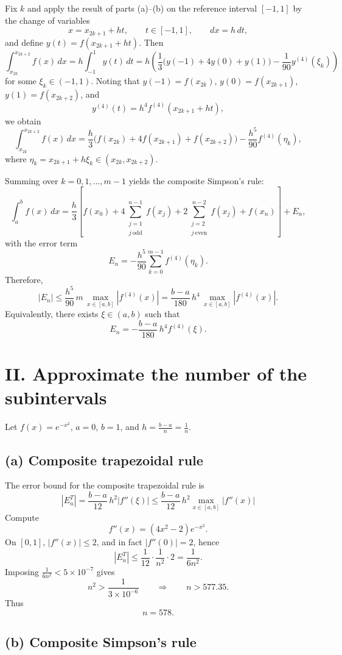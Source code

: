 \documentclass[a4paper]{article}
\begin{document}
Fix $k$ and apply the result of parts (a)--(b) on the reference interval $[-1,1]$ by the change of variables
\[
x=x_{2k+1}+ht,\qquad t\in[-1,1],\qquad dx=h\,dt,
\]
and define $y(t)=f(x_{2k+1}+ht)$. Then
\[
\int_{x_{2k}}^{x_{2k+2}} f(x)\,dx
= h\int_{-1}^{1} y(t)\,dt
= h\left(\frac{1}{3}\big(y(-1)+4y(0)+y(1)\big) - \frac{1}{90}y^{(4)}(\xi_k)\right)
\]
for some $\xi_k\in(-1,1)$. Noting that $y(-1)=f(x_{2k})$, $y(0)=f(x_{2k+1})$, $y(1)=f(x_{2k+2})$, and
\[
y^{(4)}(t)=h^{4} f^{(4)}(x_{2k+1}+ht),
\]
we obtain
\[
\int_{x_{2k}}^{x_{2k+2}} f(x)\,dx
=\frac{h}{3}\Big(f(x_{2k})+4f(x_{2k+1})+f(x_{2k+2})\Big)
-\frac{h^{5}}{90} f^{(4)}(\eta_k),
\]
where $\eta_k=x_{2k+1}+h\xi_k\in(x_{2k},x_{2k+2})$.

Summing over $k=0,1,\dots,m-1$ yields the composite Simpson's rule:
\[
\int_{a}^{b} f(x)\,dx
=\frac{h}{3}\left[
f(x_0)+4\sum_{\substack{j=1\\ j\ \mathrm{odd}}}^{n-1} f(x_j)
+2\sum_{\substack{j=2\\ j\ \mathrm{even}}}^{n-2} f(x_j)
+f(x_n)
\right] + E_n,
\]
with the error term
\[
E_n=-\frac{h^{5}}{90}\sum_{k=0}^{m-1} f^{(4)}(\eta_k).
\]
Therefore,
\[
|E_n|\le \frac{h^{5}}{90}\,m\,\max_{x\in[a,b]}|f^{(4)}(x)|
= \frac{b-a}{180}\,h^{4}\,\max_{x\in[a,b]}|f^{(4)}(x)|.
\]
Equivalently, there exists $\xi\in(a,b)$ such that
\[
E_n=-\frac{b-a}{180}\,h^{4} f^{(4)}(\xi).
\]


\section*{II. Approximate the number of the subintervals}

Let \(f(x)=e^{-x^{2}}\), \(a=0\), \(b=1\), and \(h=\frac{b-a}{n}=\frac{1}{n}\).

\subsection*{(a) Composite trapezoidal rule}

The error bound for the composite trapezoidal rule is
\[
|E_n^T| = \frac{b-a}{12}\,h^{2}|f''(\xi)|
\le \frac{b-a}{12}\,h^{2}\max_{x\in[a,b]}|f''(x)|
\]
Compute
\[
f''(x)=(4x^{2}-2)e^{-x^{2}}.
\]
On \([0,1]\), \(|f''(x)|\le 2\), and in fact \(|f''(0)|=2\), hence 
\[
|E_n^T|\le \frac{1}{12}\cdot \frac{1}{n^{2}}\cdot 2=\frac{1}{6n^{2}}.
\]
Imposing \(\frac{1}{6n^{2}}<5\times 10^{-7}\) gives
\[
n^{2}>\frac{1}{3\times 10^{-6}}
\qquad\Rightarrow\qquad n>577.35.
\]
Thus
\[
\boxed{n=578}.
\]

\subsection*{(b) Composite Simpson's rule}
\end{document}
